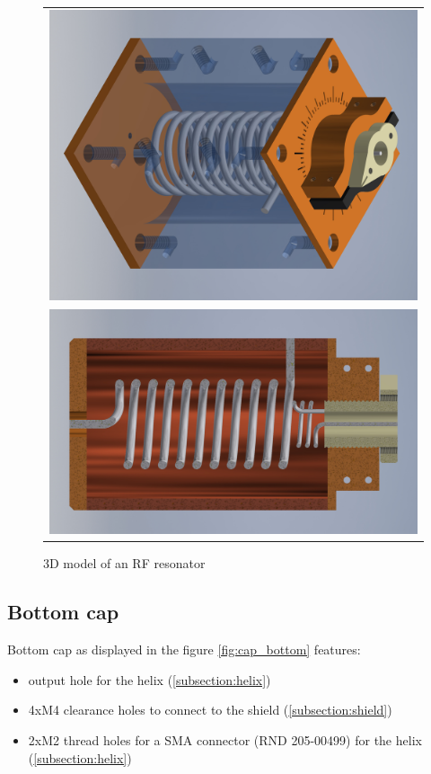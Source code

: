 \begin{figure}[h]
	\centering
	\begin{tabular}{c}
		\includegraphics[width=.95\textwidth]{images/resonator_water_small} 
		\\
		\includegraphics[width=.95\textwidth]{images/resonator_XY_small} 
	\end{tabular}
	\caption{3D model of an RF resonator}
	\label{fig:resonator}
\end{figure}

\clearpage
\subsection{Bottom cap}
\label{subsection:cap_bottom}
Bottom cap as displayed in the figure \ref{fig:cap_bottom} features:
\begin{itemize}
	\item output hole for the helix (\ref{subsection:helix})
	\item 4xM4 clearance holes to connect to the shield (\ref{subsection:shield})
	\item 2xM2 thread holes for a SMA connector (RND 205-00499) for the helix (\ref{subsection:helix})
\end{itemize}

